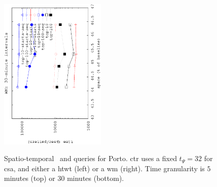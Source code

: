 \begin{figure}[!ht]
\begin{center}
			{\includegraphics[angle=-90,width=0.45\textwidth]{figures_synt/porto_st_topk_wm_30.eps}}
			
		\end{center}
		\vspace{-0.3cm}
		\caption{Spatio-temporal {\Stk\ and \Stks} queries for Porto. \acrshort{ctr} uses a fixed $t_{\Psi}=32$ for \acrlong{csa}, 
			and either a \acrlong{htwt} (left) or a \acrlong{wm} (right). 
			Time granularity is $5$ minutes (top) or $30$ minutes (bottom). 
		}
		\label{fig:portost.tk}
		\vspace{-0.3cm}
	\end{figure}






